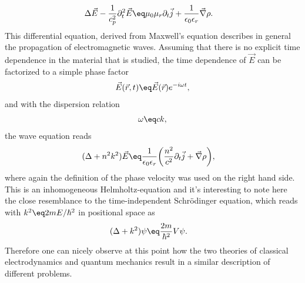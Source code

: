 \documentclass[\main/dresen_thesis.tex]{subfiles}
\begin{document}
\begin{align}
  \Delta \vec{E} - \frac{1}{c_p^2}\partial_t^2  \vec{E} \eq& \mu_0 \mu_r \partial_t \vec{j} + \frac{1}{\epsilon_0 \epsilon_r}\vec{\nabla} \rho.
\end{align}
This differential equation, derived from Maxwell's equation describes in general the propagation of electromagnetic waves.
Assuming that there is no explicit time dependence in the material that is studied, the time dependence of $\vec{E}$ can be factorized to a simple phase factor
\begin{align}
  \vec{E}(\vec{r}, t) \eq \vec{E} (\vec{r}) e^{-i\omega t},
\end{align}
and with the dispersion relation
\begin{align}
  \omega \eq c k,
\end{align}
the wave equation reads
\begin{align}
  (\Delta + n^2 k^2 )\vec{E} \eq& \frac{1}{\epsilon_0 \epsilon_r} \biggl(  \frac{n^2}{c^2} \partial_t \vec{j} + \vec{\nabla} \rho \biggr),
\end{align}
where again the definition of the phase velocity was used on the right hand side. This is an inhomogeneous Helmholtz-equation and it's interesting to note here the close resemblance to the time-independent Schr\"odinger equation, which reads with $k^2 \eq 2mE/\hbar^2$ in positional space as
\begin{align}
  (\Delta + k^2 )\psi \eq& \frac{2m}{\hbar^2} V \psi.
\end{align}
Therefore one can nicely observe at this point how the two theories of classical electrodynamics and quantum mechanics result in a similar description of different problems.
\end{document}
